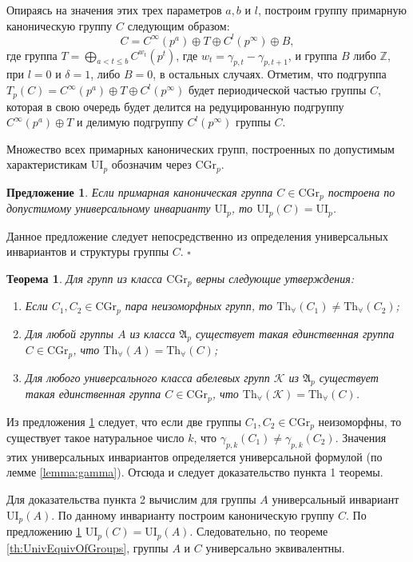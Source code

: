 \documentclass[a4paper,11pt,twoside]{article}
\newtheorem{theorem}{Теорема}[section]
\newtheorem{proposition}{Предложение}[section]
\def\proof{{\noindent{\bf Доказательство.}} }
\def\A{{\mathfrak{A}}}
\def\K{{\mathcal{K}}}
\def\Z{{\mathbb{Z}}}
\def\Tha{{\mathrm{Th}_\forall}}
\def\CG{{\mathrm{CGr}}}
\def\ui{{\mathrm{UI}}}
\begin{document}
Опираясь на значения этих трех параметров $a, b$ и $l$, построим группу примарную каноническую группу $C$ следующим образом:
$$C = C^\infty(p^a) \oplus T \oplus C^l(p^\infty) \oplus B ,$$
где группа $T = \bigoplus\limits_{ a < t \leq b} C^{w_t}(p^t)$, где $w_t = \gamma_{p,t} - \gamma_{p,t+1}$, и группа $B$ либо $\Z$, при $l = 0$ и $\delta = 1$, либо $B = 0$, в остальных случаях. Отметим, что подгруппа $T_p(C) = C^\infty(p^a) \oplus T \oplus C^l(p^\infty)$ будет периодической частью группы $C$, которая в свою очередь будет делится на редуцированную подгруппу $C^\infty(p^a) \oplus T$ и делимую подгруппу $C^l(p^\infty)$ группы $C$.

Множество всех примарных канонических групп, построенных по допустимым характеристикам $\ui_p$ обозначим через $\CG_p$.

\begin{proposition}\label{prop:UnivEnvForCannonicalGroup}
Если примарная каноническая группа $C \in \CG_p$ построена по допустимому универсальному инварианту $\ui_p$, то $\ui_p(C) = \ui_p$.
\end{proposition}
\proof Данное предложение следует непосредственно из определения универсальных инвариантов и структуры группы $C$. $\square$

\begin{theorem}\label{th:CannonicalGroupsP}
Для групп из класса $\CG_p$ верны следующие утверждения:
\begin{enumerate}
\item Если $C_1, C_2 \in \CG_p$ пара неизоморфных групп, то $\Tha(C_1) \neq \Tha(C_2)$;
\item Для любой группы $A$ из класса $\A_p$ существует такая единственная группа $C \in \CG_p$, что $\Tha(A) = \Tha(C)$;
\item Для любого универсального класса абелевых групп $\K$ из $\A_p$ существует такая единственная группа $C \in \CG_p$, что $\Tha(\K) = \Tha(C)$.
\end{enumerate}
\end{theorem}
\proof Из предложения \ref{prop:UnivEnvForCannonicalGroup} следует, что если две группы $C_1, C_2 \in \CG_p$ неизоморфны, то существует такое натуральное число $k$, что $\gamma_{p,k}(C_1) \neq \gamma_{p,k}(C_2)$. Значения этих универсальных инвариантов определяется универсальной формулой (по лемме \ref{lemma:gamma}). Отсюда и следует доказательство пункта 1 теоремы.

Для доказательства пункта 2 вычислим для группы $A$ универсальный инвариант $\ui_p(A)$. По данному инварианту построим каноническую группу $C$. По предложению \ref{prop:UnivEnvForCannonicalGroup} $\ui_p(C) = \ui_p(A)$. Следовательно, по теореме \ref{th:UnivEquivOfGroups}, группы $A$ и $C$ универсально эквивалентны.
\end{document}
